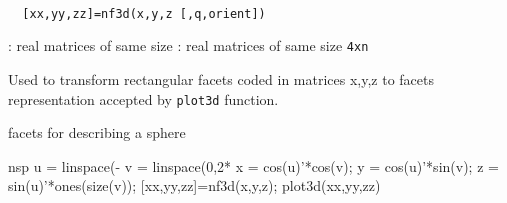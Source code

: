 \begin{mandesc}
   \\
\end{mandesc}
\begin{calling_sequence}
\begin{verbatim}
  [xx,yy,zz]=nf3d(x,y,z [,q,orient])
\end{verbatim}
\end{calling_sequence}
\begin{parameters}
  \begin{varlist}
    : real matrices of same size
    : real matrices of same size \verb!4xn!
  \end{varlist}
\end{parameters}
\begin{mandescription}
  Used to transform rectangular facets coded in matrices x,y,z
  to facets representation accepted by \verb!plot3d! function.
\end{mandescription}
\begin{examples}
\noindent facets for describing a sphere
  \begin{mintednsp}{nsp}
    u = linspace(-%
    v = linspace(0,2*%
    x = cos(u)'*cos(v);
    y = cos(u)'*sin(v);
    z = sin(u)'*ones(size(v));
    [xx,yy,zz]=nf3d(x,y,z); plot3d(xx,yy,zz)
  \end{mintednsp}
\end{examples}
\begin{manseealso}
\end{manseealso}
